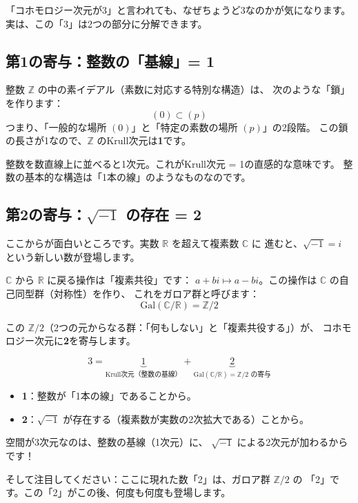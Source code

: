 \documentclass[12pt,a4paper]{article}
\begin{document}
「コホモロジー次元が3」と言われても、なぜちょうど3なのかが気になります。
実は、この「3」は2つの部分に分解できます。

\subsection{第1の寄与：整数の「基線」= 1}

整数 $\mathbb{Z}$ の中の素イデアル（素数に対応する特別な構造）は、
次のような「鎖」を作ります：
\[
  (0) \subset (p)
\]
つまり、「一般的な場所 $(0)$」と「特定の素数の場所 $(p)$」の2段階。
この鎖の長さが1なので、$\mathbb{Z}$ のKrull次元は\textbf{1}です。

\begin{analogy}[数直線のアナロジー]
整数を数直線上に並べると1次元。これがKrull次元 = 1の直感的な意味です。
整数の基本的な構造は「1本の線」のようなものなのです。
\end{analogy}

\subsection{第2の寄与：$\sqrt{-1}$ の存在 = 2}

ここからが面白いところです。実数 $\mathbb{R}$ を超えて複素数 $\mathbb{C}$ に
進むと、$\sqrt{-1} = i$ という新しい数が登場します。

$\mathbb{C}$ から $\mathbb{R}$ に戻る操作は「複素共役」です：
$a + bi \mapsto a - bi$。この操作は $\mathbb{C}$ の自己同型群（対称性）を作り、
これをガロア群と呼びます：
\[
  \mathrm{Gal}(\mathbb{C}/\mathbb{R}) = \mathbb{Z}/2
\]

この $\mathbb{Z}/2$（2つの元からなる群：「何もしない」と「複素共役する」）が、
コホモロジー次元に\textbf{2}を寄与します。

\begin{keypoint}[3の分解]
\[
  3 = \underbrace{1}_{\text{Krull次元（整数の基線）}} +
      \underbrace{2}_{\text{$\mathrm{Gal}(\mathbb{C}/\mathbb{R}) = \mathbb{Z}/2$ の寄与}}
\]
\begin{itemize}
  \item \textbf{1}：整数が「1本の線」であることから。
  \item \textbf{2}：$\sqrt{-1}$ が存在する（複素数が実数の2次拡大である）ことから。
\end{itemize}
空間が3次元なのは、整数の基線（1次元）に、
$\sqrt{-1}$ による2次元が加わるからです！
\end{keypoint}

そして注目してください：ここに現れた数「2」は、ガロア群 $\mathbb{Z}/2$ の
「2」です。この「2」がこの後、何度も何度も登場します。
\end{document}
